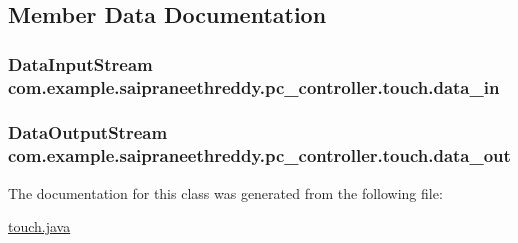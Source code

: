 \subsection{Member Data Documentation}
\subsubsection[{\texorpdfstring{data\+\_\+in}{data_in}}]{\setlength{\rightskip}{0pt plus 5cm}Data\+Input\+Stream com.\+example.\+saipraneethreddy.\+pc\+\_\+controller.\+touch.\+data\+\_\+in\hspace{0.3cm}{\ttfamily [package]}}\hypertarget{classcom_1_1example_1_1saipraneethreddy_1_1pc__controller_1_1touch_ab35bae7e144222b53568d62f1aec74f8}{}\label{classcom_1_1example_1_1saipraneethreddy_1_1pc__controller_1_1touch_ab35bae7e144222b53568d62f1aec74f8}
\subsubsection[{\texorpdfstring{data\+\_\+out}{data_out}}]{\setlength{\rightskip}{0pt plus 5cm}Data\+Output\+Stream com.\+example.\+saipraneethreddy.\+pc\+\_\+controller.\+touch.\+data\+\_\+out\hspace{0.3cm}{\ttfamily [package]}}\hypertarget{classcom_1_1example_1_1saipraneethreddy_1_1pc__controller_1_1touch_ac871e92eec06ef34db2847f7cb0c0cad}{}\label{classcom_1_1example_1_1saipraneethreddy_1_1pc__controller_1_1touch_ac871e92eec06ef34db2847f7cb0c0cad}


The documentation for this class was generated from the following file\+:\begin{DoxyCompactItemize}
\item 
\hyperlink{touch_8java}{touch.\+java}\end{DoxyCompactItemize}
